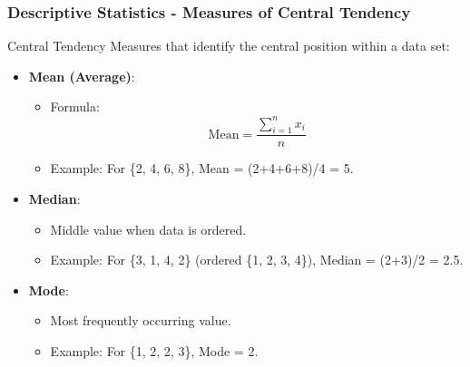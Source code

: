 \documentclass[aspectratio=169]{beamer}
\begin{document}
\begin{frame}[fragile]
    \frametitle{Descriptive Statistics - Measures of Central Tendency}
    \begin{block}{Central Tendency}
        Measures that identify the central position within a data set:
    \end{block}
    \begin{itemize}
        \item \textbf{Mean (Average)}:
            \begin{itemize}
                \item Formula: 
                \[
                \text{Mean} = \frac{\sum_{i=1}^n x_i}{n}
                \]
                \item Example: For \{2, 4, 6, 8\}, Mean = (2+4+6+8)/4 = 5.
            \end{itemize}
        \item \textbf{Median}:
            \begin{itemize}
                \item Middle value when data is ordered.
                \item Example: For \{3, 1, 4, 2\} (ordered \{1, 2, 3, 4\}), Median = (2+3)/2 = 2.5.
            \end{itemize}
        \item \textbf{Mode}:
            \begin{itemize}
                \item Most frequently occurring value.
                \item Example: For \{1, 2, 2, 3\}, Mode = 2.
            \end{itemize}
    \end{itemize}
\end{frame}
\end{document}
